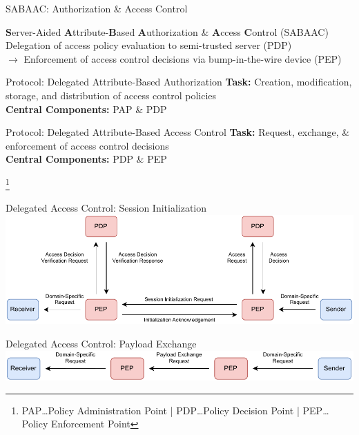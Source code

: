 \documentclass[en]{sdqbeamer}
\newcommand\nonumberfootnote[1]{%
  \begingroup
  \renewcommand\thefootnote{}\footnote{#1}%
  \addtocounter{footnote}{-1}%
  \endgroup
}
\begin{document}
\begin{frame}{SABAAC: Authorization \& Access Control}
    \begin{greenblock}{\textbf{S}erver-Aided \textbf{A}ttribute-\textbf{B}ased \textbf{A}uthorization \& \textbf{A}ccess \textbf{C}ontrol (SABAAC)}
        Delegation of access policy evaluation to semi-trusted server (PDP)
        \\$\rightarrow$ Enforcement of access control decisions via bump-in-the-wire device (PEP)
    \end{greenblock}
    \begin{blueblock}{Protocol: Delegated Attribute-Based Authorization}
        \textbf{Task:} Creation, modification, storage, and distribution of access control policies
        \\\textbf{Central Components:} PAP \& PDP
    \end{blueblock}
    \begin{blueblock}{Protocol: Delegated Attribute-Based Access Control}
        \textbf{Task:} Request, exchange, \& enforcement of access control decisions
        \\\textbf{Central Components:} PDP \& PEP
    \end{blueblock}
    \nonumberfootnote{PAP\dots Policy Administration Point | PDP\dots Policy Decision Point | PEP\dots Policy Enforcement Point}
\end{frame}
\begin{frame}{Delegated Access Control: Session Initialization}
    \centering
    \includegraphics[width=1.0\textwidth]{./figures/SABAAC_protocols_accesscontrol_initialization_shortened.drawio.pdf}
\end{frame}
\begin{frame}{Delegated Access Control: Payload Exchange}
    \centering
    \includegraphics[width=1.0\textwidth]{./figures/SABAAC_protocols_accesscontrol_payloadexchange.drawio.pdf}
\end{frame}
\end{document}
